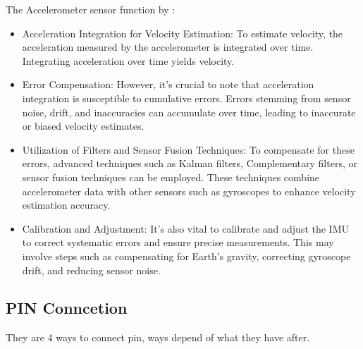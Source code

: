 \bigskip 

The Accelerometer sensor function by : 

\begin{itemize}
    \item Acceleration Integration for Velocity Estimation: To estimate velocity, the acceleration measured by the accelerometer is integrated over time. Integrating acceleration over time yields velocity.
    
    \item Error Compensation: However, it's crucial to note that acceleration integration is susceptible to cumulative errors. Errors stemming from sensor noise, drift, and inaccuracies can accumulate over time, leading to inaccurate or biased velocity estimates.
    
    \item Utilization of Filters and Sensor Fusion Techniques: To compensate for these errors, advanced techniques such as Kalman filters, Complementary filters, or sensor fusion techniques can be employed. These techniques combine accelerometer data with other sensors such as gyroscopes to enhance velocity estimation accuracy.
    
    \item Calibration and Adjustment: It's also vital to calibrate and adjust the IMU to correct systematic errors and ensure precise measurements. This may involve steps such as compensating for Earth's gravity, correcting gyroscope drift, and reducing sensor noise. 
    
\end{itemize}
\subsection{PIN Conncetion}

They are 4 ways to connect pin, ways depend of what they have after. 

